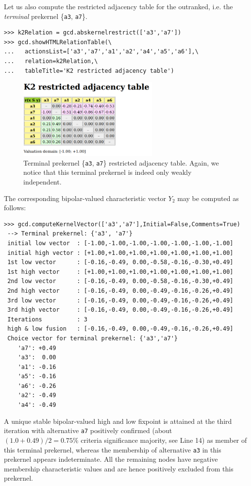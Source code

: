 Let us also compute the restricted adjacency table for the outranked, i.e. the \emph{terminal} prekernel \{\texttt{a3}, \texttt{a7}\}.
\begin{lstlisting}
>>> k2Relation = gcd.abskernelrestrict(['a3','a7'])
>>> gcd.showHTMLRelationTable(\
...   actionsList=['a3','a7','a1','a2','a4','a5','a6'],\
...   relation=k2Relation,\
...   tableTitle='K2 restricted adjacency table')
\end{lstlisting}
\begin{figure}[h]
\sidecaption[t]
\includegraphics[width=7cm]{Figures/17-11-k2restricted.png}
\caption{Terminal prekernel \{\texttt{a3}, \texttt{a7}\} restricted adjacency table. Again, we notice that this terminal prekernel is indeed only weakly independent.}
\label{fig:17.11}       %
\end{figure}

The corresponding bipolar-valued characteristic vector $Y_2$ may be computed as follows:
\begin{lstlisting}
>>> gcd.computeKernelVector(['a3','a7'],Initial=False,Comments=True)
 --> Terminal prekernel: {'a3', 'a7'}
 initial low vector  : [-1.00,-1.00,-1.00,-1.00,-1.00,-1.00,-1.00]
 initial high vector : [+1.00,+1.00,+1.00,+1.00,+1.00,+1.00,+1.00]
 1st low vector      : [-0.16,-0.49, 0.00,-0.58,-0.16,-0.30,+0.49]
 1st high vector     : [+1.00,+1.00,+1.00,+1.00,+1.00,+1.00,+1.00]
 2nd low vector      : [-0.16,-0.49, 0.00,-0.58,-0.16,-0.30,+0.49]
 2nd high vector     : [-0.16,-0.49, 0.00,-0.49,-0.16,-0.26,+0.49]
 3rd low vector      : [-0.16,-0.49, 0.00,-0.49,-0.16,-0.26,+0.49]
 3rd high vector     : [-0.16,-0.49, 0.00,-0.49,-0.16,-0.26,+0.49]
 Iterations          : 3
 high & low fusion   : [-0.16,-0.49, 0.00,-0.49,-0.16,-0.26,+0.49]
 Choice vector for terminal prekernel: {'a3','a7'}
    'a7': +0.49
    'a3':  0.00
    'a1': -0.16
    'a5': -0.16
    'a6': -0.26
    'a2': -0.49
    'a4': -0.49
\end{lstlisting}
A unique stable bipolar-valued high and low fixpoint is attained at the third iteration with alternative \texttt{a7} positively confirmed (about $(1.0+0.49)/2 = 0.75\%$ criteria significance majority, see Line 14) as member of this terminal prekernel, whereas the membership of alternative \texttt{a3} in this prekernel appears indeterminate. All the remaining nodes have negative membership characteristic values and are hence positively excluded from this prekernel.

